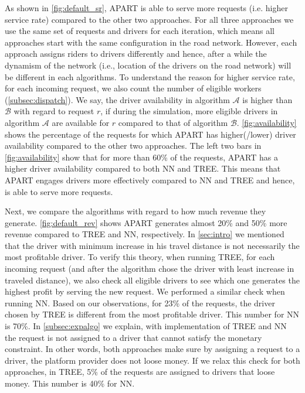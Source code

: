 As shown in \cref{fig:default_sr}, APART is able to serve more requests (i.e. higher service rate) compared to the other two approaches. For all three approaches we use the same set of requests and drivers for each iteration, which means all approaches start with the same configuration in the road network. However, each approach assigns riders to drivers differently and hence, after a while the dynamism of the network (i.e., location of the drivers on the road network) will be different in each algorithms. To understand the reason for higher service rate, for each incoming request, we also count the number of eligible workers (\cref{subsec:dispatch}). We say, the driver availability in algorithm $\mathcal{A}$ is higher than $\mathcal{B}$ with regard to request $r$, if during the simulation, more eligible drivers in algorithm $\mathcal{A}$ are available for $r$ compared to that of algorithm $\mathcal{B}$. \cref{fig:availability} shows the percentage of the requests for which APART has higher(/lower) driver availability compared to the other two approaches. The left two bars in \cref{fig:availability} show that for more than 60\% of the requests, APART has a higher driver availability compared to both NN and TREE. This means that APART engages drivers more effectively compared to NN and TREE and hence, is able to serve more requests.

Next, we compare the algorithms with regard to how much revenue they generate. \cref{fig:default_rev} shows APART generates almost 20\% and 50\% more revenue compared to TREE and NN, respectively. In \cref{sec:intro} we mentioned that the driver with minimum increase in his travel distance is not necessarily the most profitable driver. To verify this theory, when running TREE, for each incoming request (and after the algorithm chose the driver with least increase in traveled distance), we also check all eligible drivers to see which one generates the highest profit by serving the new request. We performed a similar check when running NN. Based on our observations, for 23\% of the requests, the driver chosen by TREE is different from the most profitable driver. This number for NN is 70\%. In \cref{subsec:expalgo} we explain, with implementation of TREE and NN the request is not assigned to a driver that cannot satisfy the monetary constraint. In other words, both approaches make sure by assigning a request to a driver, the platform provider does not loose money. If we relax this check for both approaches, in TREE, 5\% of the requests are assigned to drivers that loose money. This number is 40\% for NN.

